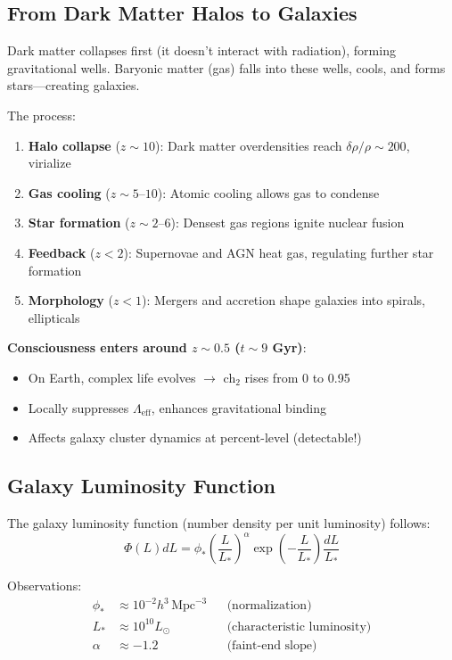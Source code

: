 \subsection{From Dark Matter Halos to Galaxies}

\begin{intuitive}
Dark matter collapses first (it doesn't interact with radiation), forming gravitational wells. Baryonic matter (gas) falls into these wells, cools, and forms stars—creating galaxies\cite{white1978,blumenthal1984}.

The process:
\begin{enumerate}
\item \textbf{Halo collapse} ($z \sim 10$): Dark matter overdensities reach $\delta \rho / \rho \sim 200$, virialize
\item \textbf{Gas cooling} ($z \sim 5\text{--}10$): Atomic cooling allows gas to condense
\item \textbf{Star formation} ($z \sim 2\text{--}6$): Densest gas regions ignite nuclear fusion
\item \textbf{Feedback} ($z < 2$): Supernovae and AGN heat gas, regulating further star formation
\item \textbf{Morphology} ($z < 1$): Mergers and accretion shape galaxies into spirals, ellipticals
\end{enumerate}

\textbf{Consciousness enters around $z \sim 0.5$ ($t \sim 9$ Gyr)}:
\begin{itemize}
\item On Earth, complex life evolves $\to$ ch$_2$ rises from 0 to 0.95
\item Locally suppresses $\Lambda_{\text{eff}}$, enhances gravitational binding
\item Affects galaxy cluster dynamics at percent-level (detectable!)
\end{itemize}
\end{intuitive}

\subsection{Galaxy Luminosity Function}

\begin{defn}\label{def:schechter}
The galaxy luminosity function (number density per unit luminosity) follows\cite{schechter1976}:
\begin{equation}
\Phi(L) dL = \phi_* \left( \frac{L}{L_*} \right)^\alpha \exp\left( -\frac{L}{L_*} \right) \frac{dL}{L_*}
\end{equation}

Observations\cite{blanton2003}:
\begin{align}
\phi_* &\approx 10^{-2} h^3 \, \text{Mpc}^{-3} && \text{(normalization)} \\
L_* &\approx 10^{10} L_\odot && \text{(characteristic luminosity)} \\
\alpha &\approx -1.2 && \text{(faint-end slope)}
\end{align}
\end{defn}

